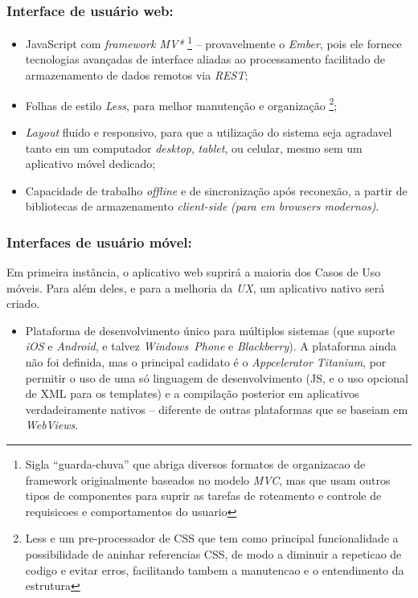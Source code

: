 \documentclass[a4paper]{abnt}
\begin{document}
\subsubsection{Interface de usuário web:}
\begin{itemize}
	\item
		JavaScript com \emph{framework MV*}
			\footnote{Sigla ``guarda-chuva'' que abriga diversos formatos de organizacao de
				framework originalmente baseados no modelo \emph{MVC}, mas que usam outros
				tipos de componentes para suprir as tarefas de roteamento e controle de
				requisicoes e comportamentos do usuario}
		-- provavelmente o \emph{Ember}, pois ele fornece tecnologias avançadas de interface
		aliadas ao processamento facilitado de armazenamento de dados remotos via \emph{REST};
			
	\item Folhas de estilo \emph{Less}, para melhor manutenção e organização
		\footnote{Less e um pre-processador de CSS que tem como principal funcionalidade a
			possibilidade de aninhar referencias CSS, de modo a diminuir a repeticao de codigo
			e evitar erros, facilitando tambem a manutencao e o entendimento da estrutura};
			
	\item \emph{Layout} fluido e responsivo, para que a utilização do sistema seja agradavel tanto em um
		computador \emph{desktop}, \emph{tablet}, ou celular, mesmo sem um aplicativo móvel dedicado;
		
	\item Capacidade de trabalho \emph{offline} e de sincronização após reconexão, a partir de bibliotecas
		de armazenamento \emph{client-side} \emph{(para em browsers modernos)}.
\end{itemize}

\pagebreak
\subsubsection{Interfaces de usuário móvel:}
Em primeira instância, o aplicativo web suprirá a maioria dos Casos de Uso móveis.
Para além deles, e para a melhoria da \emph{UX}, um aplicativo nativo será criado.
	
\begin{itemize}
\item Plataforma de desenvolvimento único para múltiplos sistemas (que suporte \emph{iOS} e \emph{Android}, e
talvez \emph{Windows~Phone} e \emph{Blackberry}). A plataforma ainda não foi definida, mas o principal cadidato
é o \emph{Appcelerator Titanium}, por permitir o uso de uma só linguagem de desenvolvimento (JS, e o uso opcional
de XML para os templates) e a compilação posterior em aplicativos verdadeiramente nativos -- diferente de outras
plataformas que se baseiam em \emph{WebViews}.	
\end{itemize}
\end{document}
